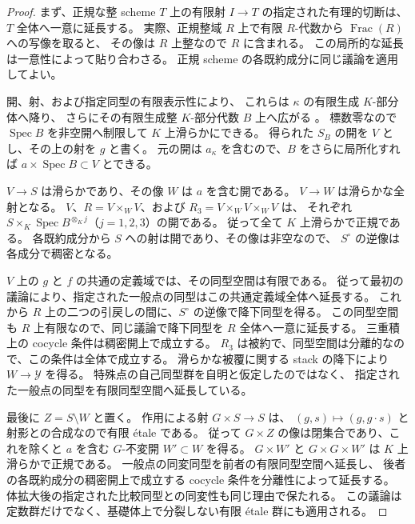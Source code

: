 \begin{proof}
まず、正規な整 scheme $T$ 上の有限射 $I\to T$ の指定された有理的切断は、
$T$ 全体へ一意に延長する。
実際、正規整域 $R$ 上で有限 $R$-代数から $\operatorname{Frac}(R)$ への写像を取ると、
その像は $R$ 上整なので $R$ に含まれる。
この局所的な延長は一意性によって貼り合わさる。
正規 scheme の各既約成分に同じ議論を適用してよい。

開、射、および指定同型の有限表示性により、
これらは $\kappa$ の有限生成 $K$-部分体へ降り、
さらにその有限生成整 $K$-部分代数 $B$ 上へ広がる
\cite[Lemma~102.3.7, Tag~0CMX]{NFMStacksStackLimits}。
標数零なので $\operatorname{Spec}B$ を非空開へ制限して $K$ 上滑らかにできる。
得られた $S_B$ の開を $V$ とし、その上の射を $g$ と書く。
元の開は $a_\kappa$ を含むので、$B$ をさらに局所化すれば
$a\times\operatorname{Spec}B\subset V$ とできる。

$V\to S$ は滑らかであり、その像 $W$ は $a$ を含む開である。
$V\to W$ は滑らかな全射となる。
$V$、$R=V\times_WV$、および $R_3=V\times_WV\times_WV$ は、
それぞれ $S\times_K\operatorname{Spec}B^{\otimes_K j}$（$j=1,2,3$）の開である。
従って全て $K$ 上滑らかで正規である。
各既約成分から $S$ への射は開であり、その像は非空なので、
$S^\circ$ の逆像は各成分で稠密となる。

$V$ 上の $g$ と $f$ の共通の定義域では、その同型空間は有限である。
従って最初の議論により、指定された一般点の同型はこの共通定義域全体へ延長する。
これから $R$ 上の二つの引戻しの間に、$S^\circ$ の逆像で降下同型を得る。
この同型空間も $R$ 上有限なので、同じ議論で降下同型を $R$ 全体へ一意に延長する。
三重積上の cocycle 条件は稠密開上で成立する。
$R_3$ は被約で、同型空間は分離的なので、この条件は全体で成立する。
滑らかな被覆に関する stack の降下により $W\to\mathcal Y$ を得る。
特殊点の自己同型群を自明と仮定したのではなく、
指定された一般点の同型を有限同型空間へ延長している。

最後に $Z=S\setminus W$ と置く。
作用による射 $G\times S\to S$ は、
$(g,s)\mapsto(g,g\cdot s)$ と射影との合成なので有限 \'etale である。
従って $G\times Z$ の像は閉集合であり、これを除くと
$a$ を含む $G$-不変開 $W'\subset W$ を得る。
$G\times W'$ と $G\times G\times W'$ は $K$ 上滑らかで正規である。
一般点の同変同型を前者の有限同型空間へ延長し、
後者の各既約成分の稠密開上で成立する cocycle 条件を分離性によって延長する。
体拡大後の指定された比較同型との同変性も同じ理由で保たれる。
この議論は定数群だけでなく、基礎体上で分裂しない有限 \'etale 群にも適用される。
\end{proof}

